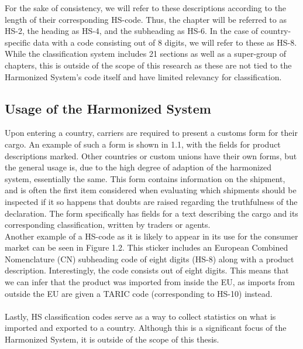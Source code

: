 For the sake of consistency, we will refer to these descriptions according to the length of their corresponding HS-code. Thus, the chapter will be referred to as HS-2, the heading as HS-4, and the subheading as HS-6. In the case of country-specific data with a code consisting out of 8 digits, we will refer to these as HS-8. While the classification system includes 21 sections as well as a super-group of chapters, this is outside of the scope of this research as these are not tied to the Harmonized System’s code itself and have limited relevancy for classification.

\subsection{Usage of the Harmonized System}
Upon entering a country, carriers are required to present a customs form for their cargo. An example of such a form is shown in 1.1, with the fields for product descriptions marked. Other countries or custom unions have their own forms, but the general usage is, due to the high degree of adaption of the harmonized system, essentially the same. This form contains information on the shipment, and is often the first item considered when evaluating which shipments should be inspected if it so happens that doubts are raised regarding the truthfulness of the declaration. The form specifically has fields for a text describing the cargo and its corresponding classification, written by traders or agents.
\\
Another example of a HS-code as it is likely to appear in its use for the consumer market can be seen in Figure 1.2. This sticker includes an European Combined Nomenclature (CN) subheading code of eight digits (HS-8) along with a product description. Interestingly, the code consists out of eight digits. This means that we can infer that the product was imported from inside the EU, as imports from outside the EU are given a TARIC code (corresponding to HS-10) instead.\\
\\
Lastly, HS classification codes serve as a way to collect statistics on what is imported and exported to a country. Although this is a significant focus of the Harmonized System, it is outside of the scope of this thesis.\\

